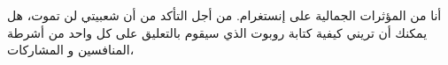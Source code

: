 \documentclass[border=0pt,varwidth=15.4cm]{standalone}
\begin{document}
\fontsize{10}{13}\selectfont
\begin{Arabic}
أنا من المؤثرات الجمالية على إنستغرام. من أجل التأكد من أن شعبيتي لن تموت، هل يمكنك أن تريني كيفية كتابة روبوت الذي سيقوم بالتعليق على كل واحد من أشرطة المنافسين و المشاركات،
\end{Arabic}
\end{document}

